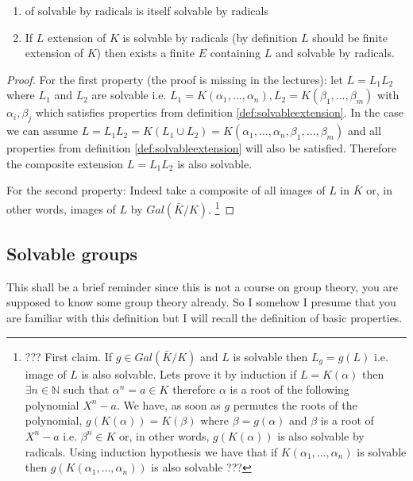 \begin{property}
  \begin{enumerate}
  \item {} of solvable by radicals is itself
    solvable by radicals
  \item If $L$ extension of $K$ is solvable by radicals (by definition
    $L$ should be finite extension of $K$) then exists a finite
     $E$ containing $L$ and solvable by
    radicals.    
  \end{enumerate}
  \begin{proof}
    For the first property (the proof is missing in the lectures): let
    $L = L_1 L_2$ where $L_1$ and $L_2$ are solvable i.e.
    $L_1 = K\left(\alpha_1, \dots, \alpha_n\right),
    L_2 = K\left(\beta_1, \dots, \beta_m\right)$ with $\alpha_i,
    \beta_j$ which satisfies properties from definition
    \ref{def:solvableextension}. In the case we can assume
    $L = L_1 L_2 = K\left(L_1 \cup L_2\right) = 
    K\left(\alpha_1, \dots, \alpha_n, \beta_1, \dots, \beta_m\right)$
    and all properties from definition
    \ref{def:solvableextension} will also be satisfied. Therefore
    the composite extension $L = L_1 L_2$ is also solvable.
    
    For the second property: Indeed take a composite of all images of $L$ in
    $\bar{K}$ or, in other words, images of $L$ by
    $Gal\left(\bar{K}/K\right)$.
    \footnote{
      ??? First claim. If $g \in Gal\left(\bar{K}/K\right)$ and $L$ is
      solvable then $L_g = g(L)$ i.e. image of $L$ is also
      solvable. Lets prove it by induction if $L =
      K\left(\alpha\right)$ then $\exists n \in \mathbb{N}$ such that
      $\alpha^n = a \in K$ therefore $\alpha$ is a root of the
      following polynomial $X^n - a$. We have, as soon as $g$ permutes the
      roots of the polynomial, $g\left(K\left(\alpha\right)\right) =
      K\left(\beta\right)$ where $\beta = g(\alpha)$ and $\beta$ is a
      root of $X^n -a$ i.e. $\beta^n \in K$ or, in other words,
      $g\left(K\left(\alpha\right)\right)$ is also solvable by
      radicals. Using induction hypothesis we have that if
      $K\left(\alpha_1, \dots, \alpha_n\right)$ is solvable then
      $g\left(K\left(\alpha_1, \dots, \alpha_n\right)\right)$ is also
      solvable ???
    }
  \end{proof}
  \label{property:solvable}
\end{property}

\subsection{Solvable groups}
This shall be a brief reminder since this is not a course on group
theory, you are supposed to know some group theory already. So I
somehow I presume that you are familiar with this definition but I
will recall the definition of basic properties.


